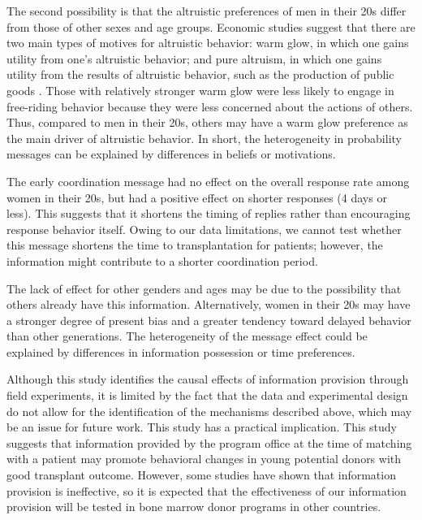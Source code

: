\documentclass[12pt, a4paper]{article}
\begin{document}
The second possibility is that the altruistic preferences of men in their 20s differ from those of other sexes and age groups. Economic studies suggest that there are two main types of motives for altruistic behavior: warm glow, in which one gains utility from one's altruistic behavior; and pure altruism, in which one gains utility from the results of altruistic behavior, such as the production of public goods \citep{Andreoni1990}. Those with relatively stronger warm glow were less likely to engage in free-riding behavior because they were less concerned about the actions of others. Thus, compared to men in their 20s, others may have a warm glow preference as the main driver of altruistic behavior. In short, the heterogeneity in probability messages can be explained by differences in beliefs or motivations.

The early coordination message had no effect on the overall response rate among women in their 20s, but had a positive effect on shorter responses (4 days or less). This suggests that it shortens the timing of replies rather than encouraging response behavior itself. Owing to our data limitations, we cannot test whether this message shortens the time to transplantation for patients; however, the information might contribute to a shorter coordination period.

The lack of effect for other genders and ages may be due to the possibility that others already have this information. Alternatively, women in their 20s may have a stronger degree of present bias and a greater tendency toward delayed behavior than other generations. The heterogeneity of the message effect could be explained by differences in information possession or time preferences.

Although this study identifies the causal effects of information provision through field experiments, it is limited by the fact that the data and experimental design do not allow for the identification of the mechanisms described above, which may be an issue for future work. This study has a practical implication. This study suggests that information provided by the program office at the time of matching with a patient may promote behavioral changes in young potential donors with good transplant outcome. However, some studies \citep[for example,][]{Switzer2018} have shown that information provision is ineffective, so it is expected that the effectiveness of our information provision will be tested in bone marrow donor programs in other countries.

\clearpage
\end{document}
